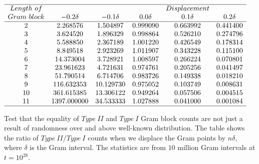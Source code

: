 \documentclass[twoside]{article}
\begin{document}
\begin{table}
\centering \(\begin{array}{cccccc}
\hline
Length~of 	& &&&Displacement \\
Gram~block	& -0.2\delta & -0.1\delta & 0.0\delta & 0.1\delta & 0.2\delta  \\
\hline
2 &2.268576&1.504897&0.999090&0.663992&0.441400 \\
3 &3.624520&1.896329&0.998864&0.526210&0.274796 \\
4 &5.588850&2.367189&1.001220&0.426549&0.178314 \\
5 &8.849518&2.923269&1.011907&0.343228&0.115100 \\
6 &14.373004&3.728921&1.008597&0.266224&0.070801 \\
7 &23.961623&4.721631&0.974761&0.205256&0.041497 \\
8 &51.790514&6.714706&0.983726&0.149338&0.018210 \\
9 &116.632353&10.129730&0.975052&0.103749&0.008631 \\
10 &361.615385&13.306122&0.949264&0.057506&0.004515 \\
11 &1397.000000&34.533333&1.027888&0.041000&0.001084 \\
\hline
\end{array}\)
\caption{Test that the equality of $Type~II$ and $Type~I$ Gram block counts are not just a result of randomness over and above well-known distribution. The table shows the ratio of $Type~II/Type~I$ counts when we displace the Gram points by $n\delta$, where $\delta$ is the Gram interval. The statistics are from $10$ million Gram intervals at $t=10^{28}$.} \label{tab:rosserrandom}
\end{table}
\end{document}
